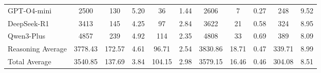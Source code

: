\documentclass[acmsmall]{acmart}
\begin{document}
\begin{table}[htbp!]
\begin{tabular}{l | c | cc | cc | c | cc | cc}
GPT-O4-mini & 2500 & 130 & 5.20 & 36 & 1.44 & 2606 & 7 & 0.27 & 248 & 9.52 \\
DeepSeek-R1 & 3413 & 145 & 4.25 & 97 & 2.84 & 3622 & 21 & 0.58 & 324 & 8.95 \\
Qwen3-Plus & 4857 & 239 & 4.92 & 114 & 2.35 & 4808 & 33 & 0.69 & 389 & 8.09 \\
\midrule
Reasoning Average & 3778.43 & 172.57 & 4.61 & 96.71 & 2.54 & 3830.86 & 18.71 & 0.47 & 339.71 & 8.99 \\
\midrule
Total Average & 3540.85 & 137.69 & 3.84 & 104.15 & 2.98 & 3579.15 & 16.46 & 0.46 & 304.08 & 8.51 \\
\bottomrule
\end{tabular}
\end{table}
\end{document}
